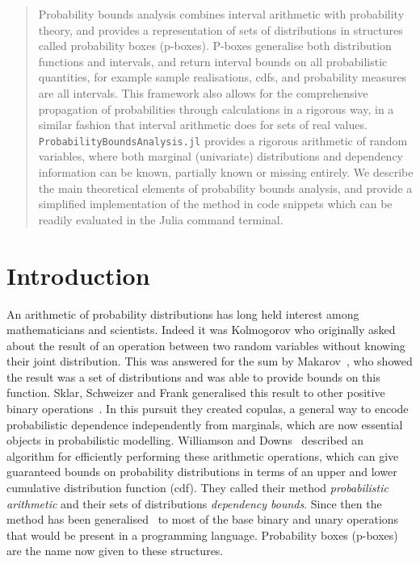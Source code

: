 \documentclass{juliacon}
\begin{document}

\maketitle
\begin{abstract}
Probability bounds analysis combines interval arithmetic with probability theory, and provides a representation of sets of distributions in structures called probability boxes (p-boxes). P-boxes generalise both distribution functions and intervals, and return interval bounds on all probabilistic quantities, for example sample realisations, cdfs, and probability measures are all intervals. This framework also allows for the comprehensive propagation of probabilities through calculations in a rigorous way, in a similar fashion that interval arithmetic does for sets of real values. \texttt{ProbabilityBoundsAnalysis.jl} provides a rigorous arithmetic of random variables, where both marginal (univariate) distributions and dependency information can be known, partially known or missing entirely. We describe the main theoretical elements of probability bounds analysis, and provide a simplified implementation of the method in code snippets which can be readily evaluated in the Julia command terminal.
\end{abstract}
\section{Introduction}
\label{sec:intro}
An arithmetic of probability distributions has long held interest among mathematicians and scientists. Indeed it was Kolmogorov who originally asked about the result of an operation between two random variables without knowing their joint distribution. This was answered for the sum by Makarov~\cite{makarov1982estimates}, who showed the result was a set of distributions and was able to provide bounds on this function. Sklar, Schweizer and Frank generalised this result to other positive binary operations~\cite{frank1987best,schweizer2011probabilistic}. In this pursuit they created copulas, a general way to encode probabilistic dependence independently from marginals, which are now essential objects in probabilistic modelling. Williamson and Downs~\cite{williamson1990probabilistic} described an algorithm for efficiently performing these arithmetic operations, which can give guaranteed bounds on probability distributions in terms of an upper and lower cumulative distribution function (cdf). They called their method \textit{probabilistic arithmetic} and their sets of distributions \textit{dependency bounds}. Since then the method has been generalised~\cite{ferson2015constructing,ferson1996whereof,ferson2004arithmetic} to most of the base binary and unary operations that would be present in a programming language. Probability boxes (p-boxes) are the name now given to these structures.
\end{document}
